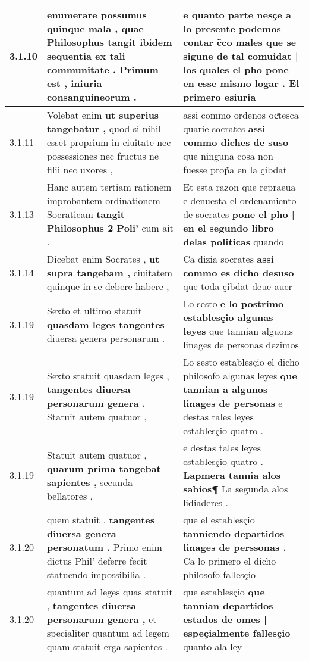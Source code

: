 \begin{tabular}{|p{1cm}|p{6.5cm}|p{6.5cm}|}
3.1.10 & enumerare possumus quinque mala , \textbf{ quae Philosophus tangit ibidem sequentia ex tali communitate . } Primum est , iniuria consanguineorum . & e quanto parte nesçe a lo presente podemos contar c̃co males \textbf{ que se sigune de tal comuidat | los quales el pho pone en esse mismo logar . } El primero esiuria \\\hline
3.1.11 & Volebat enim \textbf{ ut superius tangebatur , } quod si nihil esset proprium in ciuitate nec possessiones nec fructus ne filii nec uxores , & assi commo ordenos ocͣtesca quarie socrates \textbf{ assi commo diches de suso } que ninguna cosa non fuesse prop̃a en la çibdat \\\hline
3.1.13 & Hanc autem tertiam rationem improbantem ordinationem Socraticam \textbf{ tangit Philosophus 2 Poli’ } cum ait . & Et esta razon que repraeua e denuesta el ordenamiento de socrates \textbf{ pone el pho | en el segundo libro delas politicas } quando \\\hline
3.1.14 & Dicebat enim Socrates , \textbf{ ut supra tangebam , } ciuitatem quinque in se debere habere , & Ca dizia socrates \textbf{ assi commo es dicho desuso } que toda çibdat deue auer \\\hline
3.1.19 & Sexto et ultimo statuit \textbf{ quasdam leges tangentes } diuersa genera personarum . & Lo sesto \textbf{ e lo postrimo establesçio algunas leyes } que tannian alguons linages de personas dezimos \\\hline
3.1.19 & Sexto statuit quasdam leges , \textbf{ tangentes diuersa personarum genera . } Statuit autem quatuor , & Lo sesto establesçio el dicho philosofo algunas leyes \textbf{ que tannian a algunos linages de personas } e destas tales leyes establesçio quatro . \\\hline
3.1.19 & Statuit autem quatuor , \textbf{ quarum prima tangebat sapientes , } secunda bellatores , & e destas tales leyes establesçio quatro . \textbf{ Lapmera tannia alos sabios¶ } La segunda alos lidiaderes . \\\hline
3.1.20 & quem statuit , \textbf{ tangentes diuersa genera personatum . } Primo enim dictus Phil’ deferre fecit statuendo impossibilia . & que el establesçio \textbf{ tanniendo departidos linages de perssonas . } Ca lo primero el dicho philosofo fallesçio \\\hline
3.1.20 & quantum ad leges quas statuit , \textbf{ tangentes diuersa personarum genera , } et specialiter quantum ad legem quam statuit erga sapientes . & que establesçio \textbf{ que tannian departidos estados de omes | espeçialmente fallesçio } quanto ala ley \\\hline

\end{tabular}
